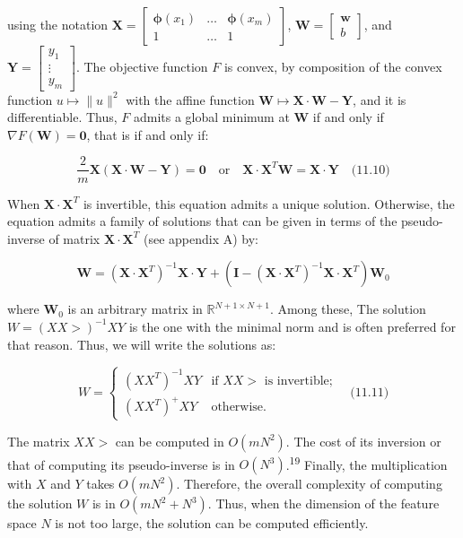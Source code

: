 \documentclass[fleqn,10pt]{olplainarticle}
\begin{document}
using the notation $\mathbf{X} = \begin{bmatrix} \boldsymbol{\phi}(x_1) & \ldots & \boldsymbol{\phi}(x_m) \\ 1 & \ldots & 1 \end{bmatrix}$, $\mathbf{W} = \begin{bmatrix} \mathbf{w} \\ b \end{bmatrix}$, and $\mathbf{Y} = \begin{bmatrix} y_1 \\ \vdots \\ y_m \end{bmatrix}$. The objective function $F$ is convex, by composition of the convex function $u \mapsto \|u\|^2$ with the affine function $\mathbf{W} \mapsto \mathbf{X} \cdot \mathbf{W} - \mathbf{Y}$, and it is differentiable. Thus, $F$ admits a global minimum at $\mathbf{W}$ if and only if $\nabla F(\mathbf{W}) = \mathbf{0}$, that is if and only if:

\[
\frac{2}{m} \mathbf{X} \left(\mathbf{X} \cdot \mathbf{W} - \mathbf{Y}\right) = \mathbf{0} \quad \text{or} \quad \mathbf{X} \cdot \mathbf{X}^T \mathbf{W} = \mathbf{X} \cdot \mathbf{Y} \quad \text{(11.10)}
\]

When $\mathbf{X} \cdot \mathbf{X}^T$ is invertible, this equation admits a unique solution. Otherwise, the equation admits a family of solutions that can be given in terms of the pseudo-inverse of matrix $\mathbf{X} \cdot \mathbf{X}^T$ (see appendix A) by:

\[
\mathbf{W} = \left(\mathbf{X} \cdot \mathbf{X}^T\right)^{-1} \mathbf{X} \cdot \mathbf{Y} + \left(\mathbf{I} - \left(\mathbf{X} \cdot \mathbf{X}^T\right)^{-1} \mathbf{X} \cdot \mathbf{X}^T\right) \mathbf{W}_0
\]

where $\mathbf{W}_0$ is an arbitrary matrix in $\mathbb{R}^{N+1 \times N+1}$. Among these,
The solution $W = (XX>)^{-1}XY$ is the one with the minimal norm and is often preferred for that reason. Thus, we will write the solutions as:

\[
W = \begin{cases} 
      (XX^T)^{-1}XY & \text{if } XX> \text{ is invertible;} \\
      (XX^T)^\mathcal{+}XY & \text{otherwise.}
   \end{cases} \quad \text{(11.11)}
\]

The matrix $XX>$ can be computed in $O(mN^2)$. The cost of its inversion or that of computing its pseudo-inverse is in $O(N^3)$.\textsuperscript{19} Finally, the multiplication with $X$ and $Y$ takes $O(mN^2)$. Therefore, the overall complexity of computing the solution $W$ is in $O(mN^2 + N^3)$. Thus, when the dimension of the feature space $N$ is not too large, the solution can be computed efficiently.
\end{document}
